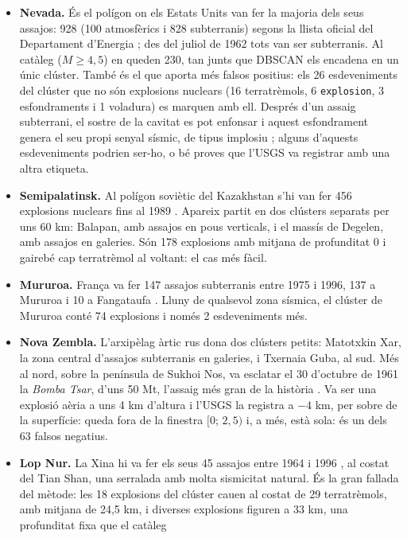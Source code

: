\documentclass[a4paper,11pt]{article}
\begin{document}
\begin{itemize}
  \item \textbf{Nevada.} És el polígon on els Estats Units van fer la majoria dels seus assajos: 928 (100 atmosfèrics i 828
        subterranis) segons la llista oficial del Departament d'Energia \cite{doe2015}; des del juliol de 1962 tots van ser
        subterranis. Al catàleg ($M\ge4{,}5$) en queden 230, tan junts que DBSCAN els encadena en un únic clúster. També és
        el que aporta més falsos positius: els 26 esdeveniments del clúster que no són explosions nuclears (16 terratrèmols, 6
        \texttt{explosion}, 3 esfondraments i 1 voladura) es marquen amb ell. Després d'un assaig subterrani, el sostre de la
        cavitat es pot enfonsar i aquest esfondrament genera el seu propi senyal sísmic, de tipus implosiu \cite{ford2009};
        alguns d'aquests esdeveniments podrien ser-ho, o bé proves que l'USGS va registrar amb una altra etiqueta.
  \item \textbf{Semipalatinsk.} Al polígon soviètic del Kazakhstan s'hi van fer 456 explosions nuclears fins al 1989
        \cite{yang2003}. Apareix partit en dos clústers separats per uns 60 km: Balapan, amb assajos en pous verticals, i el
        massís de Degelen, amb assajos en galeries. Són 178 explosions amb mitjana de profunditat 0 i gairebé cap terratrèmol
        al voltant: el cas més fàcil.
  \item \textbf{Mururoa.} França va fer 147 assajos subterranis entre 1975 i 1996, 137 a Mururoa i 10 a Fangataufa
        \cite{iaea1998}. Lluny de qualsevol zona sísmica, el clúster de Mururoa conté 74 explosions i només 2 esdeveniments més.
  \item \textbf{Nova Zembla.} L'arxipèlag àrtic rus dona dos clústers petits: Matotxkin Xar, la zona central d'assajos
        subterranis en galeries, i Txernaia Guba, al sud. Més al nord, sobre la península de Sukhoi Nos, va esclatar el 30
        d'octubre de 1961 la \emph{Bomba Tsar}, d'uns 50 Mt, l'assaig més gran de la història \cite{yang2003}. Va ser una
        explosió aèria a uns 4 km d'altura i l'USGS la registra a $-4$ km, per sobre de la superfície: queda fora de la finestra $[0;\,2{,}5)$ i, a més, està sola: és un dels 63 falsos negatius.
  \item \textbf{Lop Nur.} La Xina hi va fer els seus 45 assajos entre 1964 i 1996 \cite{yang2003}, al costat del Tian Shan,
        una serralada amb molta sismicitat natural. És la gran fallada del mètode: les 18 explosions del clúster cauen al costat
        de 29 terratrèmols, amb mitjana de 24,5 km, i diverses explosions figuren a 33 km, una profunditat fixa que el catàleg

\end{itemize}
\end{document}
